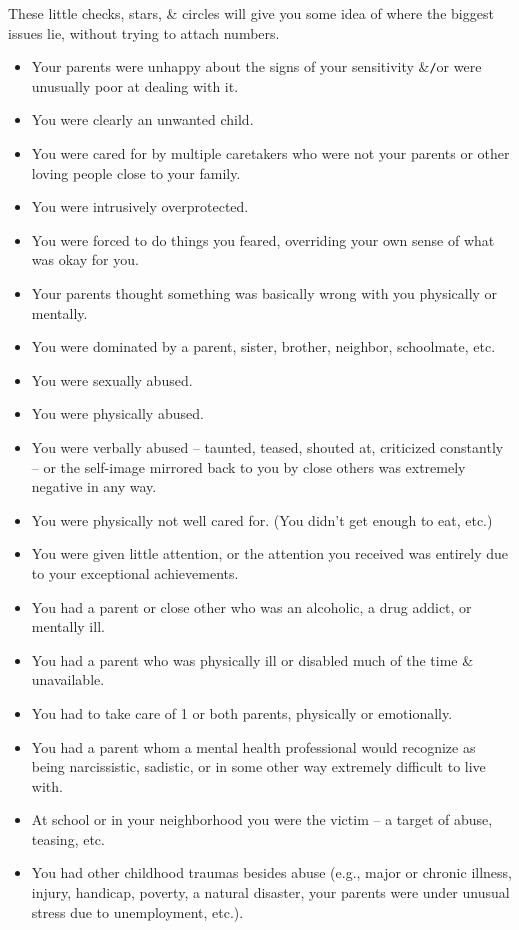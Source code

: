 \documentclass{article}
\numberwithin{equation}{section}
\begin{document}
These little checks, stars, \& circles will give you some idea of where the biggest issues lie, without trying to attach numbers.
\begin{itemize}
	\item Your parents were unhappy about the signs of your sensitivity \&{\tt/}or were unusually poor at dealing with it.
	\item You were clearly an unwanted child.
	\item You were cared for by multiple caretakers who were not your parents or other loving people close to your family.
	\item You were intrusively overprotected.
	\item You were forced to do things you feared, overriding your own sense of what was okay for you.
	\item Your parents thought something was basically wrong with you physically or mentally.
	\item You were dominated by a parent, sister, brother, neighbor, schoolmate, etc.
	\item You were sexually abused.
	\item You were physically abused.
	\item You were verbally abused -- taunted, teased, shouted at, criticized constantly -- or the self-image mirrored back to you by close others was extremely negative in any way.
	\item You were physically not well cared for. (You didn't get enough to eat, etc.)
	\item You were given little attention, or the attention you received was entirely due to your exceptional achievements.
	\item You had a parent or close other who was an alcoholic, a drug addict, or mentally ill.
	\item You had a parent who was physically ill or disabled much of the time \& unavailable.
	\item You had to take care of 1 or both parents, physically or emotionally.
	\item You had a parent whom a mental health professional would recognize as being narcissistic, sadistic, or in some other way extremely difficult to live with.
	\item At school or in your neighborhood you were the victim -- a target of abuse, teasing, etc.
	\item You had other childhood traumas besides abuse (e.g., major or chronic illness, injury, handicap, poverty, a natural disaster, your parents were under unusual stress due to unemployment, etc.).

\end{itemize}
\end{document}
